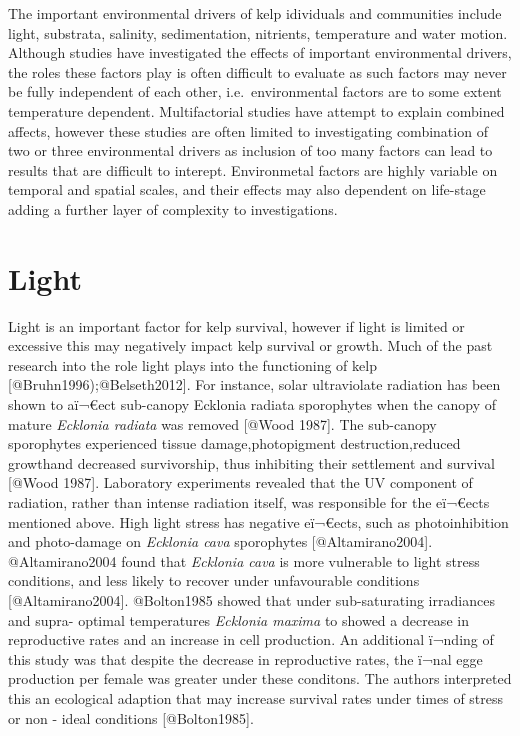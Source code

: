 \documentclass[]{article}
\newcommand{\euro}{€}
\begin{document}
The important environmental drivers of kelp idividuals and communities
include light, substrata, salinity, sedimentation, nitrients,
temperature and water motion. Although studies have investigated the
effects of important environmental drivers, the roles these factors play
is often difficult to evaluate as such factors may never be fully
independent of each other, i.e.~environmental factors are to some extent
temperature dependent. Multifactorial studies have attempt to explain
combined affects, however these studies are often limited to
investigating combination of two or three environmental drivers as
inclusion of too many factors can lead to results that are difficult to
interept. Environmetal factors are highly variable on temporal and
spatial scales, and their effects may also dependent on life-stage
adding a further layer of complexity to investigations.

\section{Light}\label{light}

Light is an important factor for kelp survival, however if light is
limited or excessive this may negatively impact kelp survival or growth.
Much of the past research into the role light plays into the functioning
of kelp {[}@Bruhn1996);@Belseth2012{]}. For instance, solar ultraviolate
radiation has been shown to aï¬\euro{}ect sub-canopy Ecklonia radiata
sporophytes when the canopy of mature \emph{Ecklonia radiata} was
removed {[}@Wood 1987{]}. The sub-canopy sporophytes experienced tissue
damage,photopigment destruction,reduced growthand decreased
survivorship, thus inhibiting their settlement and survival {[}@Wood
1987{]}. Laboratory experiments revealed that the UV component of
radiation, rather than intense radiation itself, was responsible for the
eï¬\euro{}ects mentioned above. High light stress has negative
eï¬\euro{}ects, such as photoinhibition and photo-damage on
\emph{Ecklonia cava} sporophytes {[}@Altamirano2004{]}. @Altamirano2004
found that \emph{Ecklonia cava} is more vulnerable to light stress
conditions, and less likely to recover under unfavourable conditions
{[}@Altamirano2004{]}. @Bolton1985 showed that under sub-saturating
irradiances and supra- optimal temperatures \emph{Ecklonia maxima} to
showed a decrease in reproductive rates and an increase in cell
production. An additional ï¬nding of this study was that despite the
decrease in reproductive rates, the ï¬nal egge production per female
was greater under these conditons. The authors interpreted this an
ecological adaption that may increase survival rates under times of
stress or non - ideal conditions {[}@Bolton1985{]}.
\end{document}

